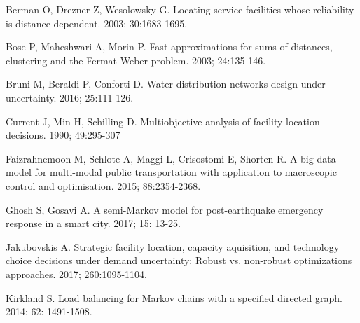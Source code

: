\documentclass[twoside,twocolumn]{article}
\begin{document}





\begin{thebibliography}{99}

Berman O, Drezner Z, Wesolowsky G.
\newblock Locating service facilities whose reliability is distance dependent.
 2003; 30:1683-1695.

Bose P, Maheshwari A, Morin P.
\newblock Fast approximations for sums of distances, clustering and the Fermat-Weber problem.
 2003; 24:135-146.

Bruni M, Beraldi P, Conforti D.
\newblock Water distribution networks design under uncertainty.
 2016; 25:111-126.

Current J, Min H, Schilling D.
\newblock Multiobjective analysis of facility location decisions.
 1990; 49:295-307

Faizrahnemoon M, Schlote A, Maggi L, Crisostomi E, Shorten R.
\newblock A big-data model for multi-modal public transportation with application to macroscopic control and optimisation.
 2015; 88:2354-2368.

Ghosh S, Gosavi A.
\newblock A semi-Markov model for post-earthquake emergency response in a smart city.
 2017; 15: 13-25.

Jakubovskis A.
\newblock Strategic facility location, capacity aquisition, and technology choice decisions under demand uncertainty: Robust vs. non-robust optimizations approaches.
 2017; 260:1095-1104.

Kirkland S.
\newblock Load balancing for Markov chains with a specified directed graph.
 2014; 62: 1491-1508.


\end{thebibliography}
\end{document}

